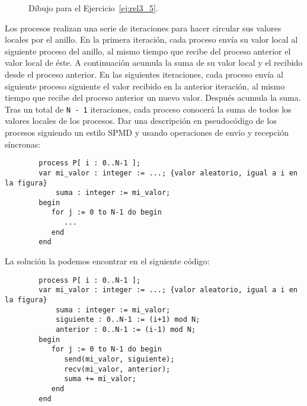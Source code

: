 \begin{ejercicio}
\begin{figure}[H]
\begin{multicols}{2}
        \end{multicols}
        \caption{Dibujo para el Ejercicio~\ref{ej:rel3_5}.}
        \label{fig:fig_ej_5}
    \end{figure}
    Los procesos realizan una serie de iteraciones para hacer circular sus valores locales por el anillo. En la primera iteración, cada proceso envía su valor local al siguiente proceso del anillo, al mismo tiempo que recibe del proceso anterior el valor local de éste. A continuación acumula la suma de su valor local y el recibido desde el proceso anterior. En las siguientes iteraciones, cada proceso envía al siguiente proceso siguiente el valor recibido en la anterior iteración, al mismo tiempo que recibe del proceso anterior un nuevo valor. Después acumula la suma. Tras un total de \verb|N - 1| iteraciones, cada proceso conocerá la suma de todos los valores locales de los procesos. Dar una descripción en pseudocódigo de los procesos siguiendo un estilo SPMD y usando operaciones de envío y recepción síncronas:
    \begin{verbatim}
        process P[ i : 0..N-1 ];
        var mi_valor : integer := ...; {valor aleatorio, igual a i en la figura}
            suma : integer := mi_valor;
        begin
           for j := 0 to N-1 do begin
              ...
           end
        end
    \end{verbatim}
    La solución la podemos encontrar en el siguiente código:
    \begin{verbatim}
        process P[ i : 0..N-1 ];
        var mi_valor : integer := ...; {valor aleatorio, igual a i en la figura}
            suma : integer := mi_valor;
            siguiente : 0..N-1 := (i+1) mod N;
            anterior : 0..N-1 := (i-1) mod N;
        begin
           for j := 0 to N-1 do begin
              send(mi_valor, siguiente);
              recv(mi_valor, anterior);
              suma += mi_valor;
           end
        end
    \end{verbatim}
\end{ejercicio}

